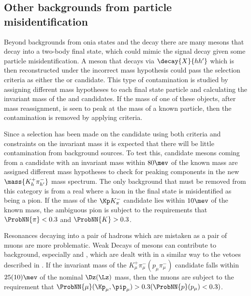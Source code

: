 \subsection{Other backgrounds from particle misidentification}
\label{sec:db:backgrounds:misid}

Beyond backgrounds from onia states and the \KS decay there are many mesons that decay into a
two-body final state, which could mimic the signal decay given some particle misidentification.
A meson that decays via $\decay{X}{hh^\prime}$ which is then reconstructed
under the incorrect mass hypothesis could pass the selection criteria as either the \db or \Kstarz
candidate.
This type of contamination is studied by assigning different mass hypotheses to each final state
particle and calculating the invariant mass of the \mumu and \kpi candidates.
If the mass of one of these objects, after mass reassignment, is seen to peak at the mass of a
known particle, then the contamination is removed by applying \pid criteria.

Since a selection has been made on the \decay{\Kstarz}{\kpi} candidate using both \pid criteria and
constraints on the \kpi invariant mass it is expected that there will be little contamination
from background sources.
To test this, candidate \Kstarz mesons coming from a \Bd candidate with an invariant mass
within $80\mev$ of the known \Bd mass are assigned different mass hypotheses to check for peaking
components in the new $\mass{K_{h}^+\pi_{h^\prime}^-}$ mass spectrum.
The only background that must be removed from this category is from a real \decay{\phi}{\kk}
where a kaon in the final state is misidentified as being a pion.
If the mass of the $\Kp K^-_\pi$ candidate lies within $10\mev$ of the known \phii mass, the
ambiguous pion is subject to the requirements that
$\ProbNN{\pi}<0.3$ and $\ProbNN{K}>0.3$.

Resonances decaying into a pair of hadrons which are mistaken as a pair of
muons are more problematic.
Weak Decays of mesons can contribute to background, especially
\decay{\Dz}{\kpi} and , which are dealt with in a similar way to the vetoes
described in .
If the invariant mass of the $K^+_\mu\pi^-_\mu(p_\mu\pi^-_\mu)$ candidate falls within $25(10)\mev$
of the nominal $\Dz(\Lz)$ mass, then the muons are subject to the requirement that
$\ProbNN{\mu}(\Kp_\mu,\pip_\mu)>0.3(\ProbNN{p}(p_\mu)<0.3)$.


